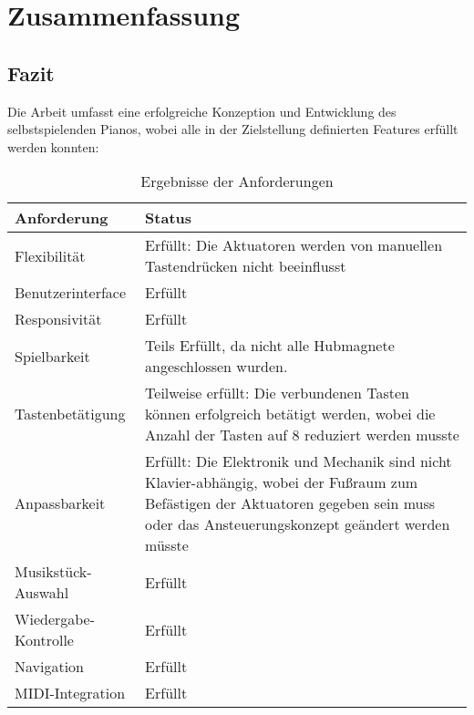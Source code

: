 
\chapter{Zusammenfassung} \label{fazit}

\section{Fazit}
Die Arbeit umfasst eine erfolgreiche Konzeption und Entwicklung des selbstspielenden Pianos, wobei alle in der Zielstellung
definierten Features erfüllt werden konnten: \newline

\begin{table}[htbp]
    \centering
    \begin{tabular}{|m{4cm}|m{8cm}|}
        \hline
        \textbf{Anforderung} &  \textbf{Status}  \\
        \hline
        Flexibilität & Erfüllt: Die Aktuatoren werden von manuellen Tastendrücken nicht beeinflusst \\
        \hline
        Benutzerinterface & Erfüllt \\
        \hline
        Responsivität & Erfüllt \\
        \hline
        Spielbarkeit & Teils Erfüllt, da nicht alle Hubmagnete angeschlossen wurden. \\
        \hline
        Tastenbetätigung & Teilweise erfüllt: Die verbundenen Tasten können erfolgreich betätigt werden, wobei die Anzahl der Tasten auf
        8 reduziert werden musste \\
        \hline
        Anpassbarkeit & Erfüllt: Die Elektronik und Mechanik sind nicht Klavier-abhängig, wobei der Fußraum zum Befästigen der Aktuatoren
        gegeben sein muss oder das Ansteuerungskonzept geändert werden müsste\\
        \hline
        Musikstück-Auswahl & Erfüllt \\
        \hline
        Wiedergabe-Kontrolle & Erfüllt \\
        \hline
        Navigation & Erfüllt \\
        \hline
        MIDI-Integration & Erfüllt \\
        \hline
    \end{tabular}
    \caption{Ergebnisse der Anforderungen}
    \label{table:anorderungen-ergebnis}
\end{table}

